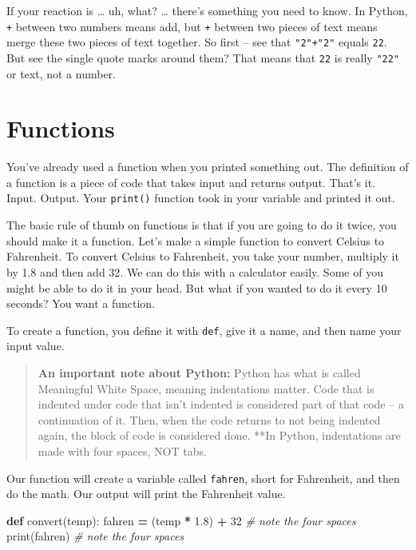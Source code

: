 \documentclass[
]{book}
\newenvironment{Shaded}{\begin{snugshade}}{\end{snugshade}}
\newcommand{\BuiltInTok}[1]{#1}
\newcommand{\CommentTok}[1]{\textcolor[rgb]{0.56,0.35,0.01}{\textit{#1}}}
\newcommand{\DecValTok}[1]{\textcolor[rgb]{0.00,0.00,0.81}{#1}}
\newcommand{\FloatTok}[1]{\textcolor[rgb]{0.00,0.00,0.81}{#1}}
\newcommand{\KeywordTok}[1]{\textcolor[rgb]{0.13,0.29,0.53}{\textbf{#1}}}
\newcommand{\NormalTok}[1]{#1}
\newcommand{\OperatorTok}[1]{\textcolor[rgb]{0.81,0.36,0.00}{\textbf{#1}}}
\begin{document}
If your reaction is \ldots{} uh, what? \ldots{} there's something you need to know. In Python, \texttt{+} between two numbers means add, but \texttt{+} between two pieces of text means merge these two pieces of text together. So first -- see that \texttt{"2"+"2"} equals \texttt{\textquotesingle{}22\textquotesingle{}}. But see the single quote marks around them? That means that \texttt{22} is really \texttt{"22"} or text, not a number.

\hypertarget{functions}{%
\section{Functions}\label{functions}}

You've already used a function when you printed something out. The definition of a function is a piece of code that takes input and returns output. That's it. Input. Output. Your \texttt{print()} function took in your variable and printed it out.

The basic rule of thumb on functions is that if you are going to do it twice, you should make it a function. Let's make a simple function to convert Celsius to Fahrenheit. To convert Celsius to Fahrenheit, you take your number, multiply it by 1.8 and then add 32. We can do this with a calculator easily. Some of you might be able to do it in your head. But what if you wanted to do it every 10 seconds? You want a function.

To create a function, you define it with \texttt{def}, give it a name, and then name your input value.

\begin{quote}
\textbf{An important note about Python:} Python has what is called Meaningful White Space, meaning indentations matter. Code that is indented under code that isn't indented is considered part of that code -- a continuation of it. Then, when the code returns to not being indented again, the block of code is considered done. **In Python, indentations are made with four spaces, NOT tabs.
\end{quote}

Our function will create a variable called \texttt{fahren}, short for Fahrenheit, and then do the math. Our output will print the Fahrenheit value.

\begin{Shaded}
\begin{Highlighting}[]
\KeywordTok{def}\NormalTok{ convert(temp):}
\NormalTok{    fahren }\OperatorTok{=}\NormalTok{ (temp }\OperatorTok{*} \FloatTok{1.8}\NormalTok{) }\OperatorTok{+} \DecValTok{32} \CommentTok{# note the four spaces}
    \BuiltInTok{print}\NormalTok{(fahren) }\CommentTok{# note the four spaces}
\end{Highlighting}
\end{Shaded}
\end{document}
